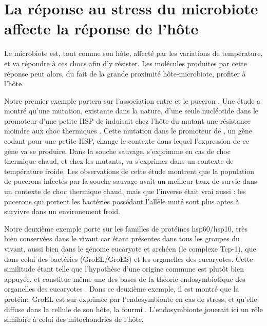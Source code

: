 
\section{La réponse au stress du microbiote affecte la réponse de l'hôte}

Le microbiote est, tout comme son hôte, affecté par les variations de température, et va répondre à ces chocs afin d'y résister.
Les molécules produites par cette réponse peut alors, du fait de la grande proximité hôte-microbiote, profiter à l'hôte.

Notre premier exemple portera sur l'association entre  et le puceron .
Une étude a montré qu'une mutation, existante dans la nature, d'une seule nucléotide dans le promoteur d'une petite HSP de  induisait chez l'hôte du mutant une résistance moindre aux choc thermiques \cite{dunbar2007}.
Cette mutation dans le promoteur de , un gène codant pour une petite HSP, change le contexte dans lequel l'expression de ce gène va se produire. Dans la souche sauvage,  s'exprimme en cas de choc thermique chaud, et chez les mutants,  va s'exprimer dans un contexte de température froide.
Les observations de cette étude montrent que la population de pucerons infectés par la souche sauvage avait un meilleur taux de survie dans un contexte de choc thermique chaud, mais que l'inverse était vrai aussi : les pucerons qui portent les bactéries possédant l'allèle muté sont plus aptes à survivre dans un environement froid.

Notre deuxième exemple porte sur les familles de protéines hsp60/hsp10, très bien conservées dans le vivant car étant présentes dans tous les groupes du vivant, aussi bien dans le génome eucaryote et archéen (le complexe Tcp-1), que dans celui des bactéries (GroEL/GroES) et les organelles des eucaryotes.
Cette similitude étant telle que l'hypothèse d'une origine commune est plutôt bien appuyée, et constitue même une des bases de la théorie endosymbiotique des organelles des eucaryotes \cite{gupta1995}.
Dans ce deuxième exemple, il est montré que la protéine GroEL est sur-exprimée par l'endosymbionte  en cas de stress, et qu'elle diffuse dans la cellule de son hôte, la fourmi  \cite{stoll2009}.
L'endosymbionte jouerait ici un rôle similaire à celui des mitochondries de l'hôte.

